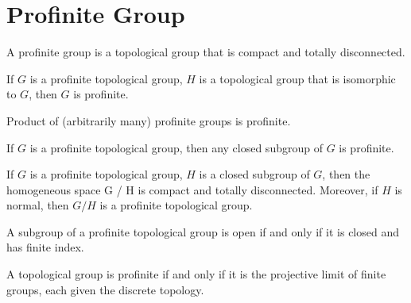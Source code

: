 %

\chapter{Profinite Group}

\begin{definition}
	\leanok
	A profinite group is a topological group that is compact and totally disconnected.
\end{definition}

\begin{lemma}
	If $G$ is a profinite topological group, $H$ is a topological group that is isomorphic to $G$, then $G$ is profinite.
\end{lemma}

\begin{lemma}
	Product of (arbitrarily many) profinite groups is profinite.
\end{lemma}

\begin{lemma}
	If $G$ is a profinite topological group, then any closed subgroup of $G$ is profinite.
\end{lemma}

\begin{lemma}
	If $G$ is a profinite topological group, $H$ is a closed subgroup of $G$, then the homogeneous space G / H is compact and totally disconnected. Moreover, if $H$ is normal, then $G / H$ is a profinite topological group.
\end{lemma}

\begin{lemma}
	A subgroup of a profinite topological group is open if and only if it is closed and has finite index.
\end{lemma}

\begin{theorem}
	A topological group is profinite if and only if it is the projective limit of finite groups, each given the discrete topology.
\end{theorem}



